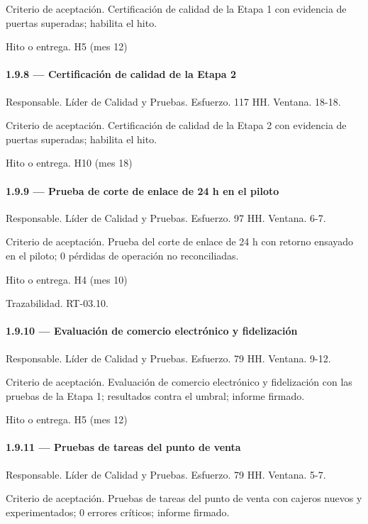 \documentclass[11pt]{article}
\begin{document}
Criterio de aceptación. Certificación de calidad de la Etapa 1 con evidencia de puertas superadas; habilita el hito.

Hito o entrega. H5 (mes 12)

\paragraph{1.9.8 — Certificación de calidad de la Etapa 2}

Responsable. Líder de Calidad y Pruebas. Esfuerzo. 117 HH. Ventana. 18-18.

Criterio de aceptación. Certificación de calidad de la Etapa 2 con evidencia de puertas superadas; habilita el hito.

Hito o entrega. H10 (mes 18)

\paragraph{1.9.9 — Prueba de corte de enlace de 24 h en el piloto}

Responsable. Líder de Calidad y Pruebas. Esfuerzo. 97 HH. Ventana. 6-7.

Criterio de aceptación. Prueba del corte de enlace de 24 h con retorno ensayado en el piloto; 0 pérdidas de operación no reconciliadas.

Hito o entrega. H4 (mes 10)

Trazabilidad. RT-03.10.

\paragraph{1.9.10 — Evaluación de comercio electrónico y fidelización}

Responsable. Líder de Calidad y Pruebas. Esfuerzo. 79 HH. Ventana. 9-12.

Criterio de aceptación. Evaluación de comercio electrónico y fidelización con las pruebas de la Etapa 1; resultados contra el umbral; informe firmado.

Hito o entrega. H5 (mes 12)

\paragraph{1.9.11 — Pruebas de tareas del punto de venta}

Responsable. Líder de Calidad y Pruebas. Esfuerzo. 79 HH. Ventana. 5-7.

Criterio de aceptación. Pruebas de tareas del punto de venta con cajeros nuevos y experimentados; 0 errores críticos; informe firmado.
\end{document}
